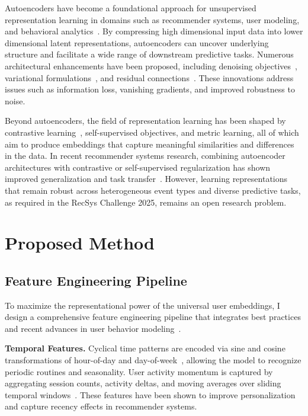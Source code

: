 \documentclass[sigconf]{acmart}
\begin{document}
Autoencoders have become a foundational approach for unsupervised representation learning in domains such as recommender systems, user modeling, and behavioral analytics~\cite{Hinton2006, Vincent2008, Kingma2014, Sedhain2015}. By compressing high dimensional input data into lower dimensional latent representations, autoencoders can uncover underlying structure and facilitate a wide range of downstream predictive tasks. Numerous architectural enhancements have been proposed, including denoising objectives~\cite{Vincent2008}, variational formulations~\cite{Kingma2014}, and residual connections~\cite{He2016ResNet, Mao2016}. These innovations address issues such as information loss, vanishing gradients, and improved robustness to noise.

Beyond autoencoders, the field of representation learning has been shaped by contrastive learning~\cite{Oord2018, Chen2020SimCLR}, self-supervised objectives, and metric learning, all of which aim to produce embeddings that capture meaningful similarities and differences in the data. In recent recommender systems research, combining autoencoder architectures with contrastive or self-supervised regularization has shown improved generalization and task transfer~\cite{Zhou2020S3Rec, Zhan2022CLAES}. However, learning representations that remain robust across heterogeneous event types and diverse predictive tasks, as required in the RecSys Challenge 2025, remains an open research problem.

\section{Proposed Method}
\label{sec:method}

\subsection{Feature Engineering Pipeline}

To maximize the representational power of the universal user embeddings, I design a comprehensive feature engineering pipeline that integrates best practices and recent advances in user behavior modeling~\cite{Quadrana2018, Christoffel2022, Covington2016, Rendle2010, Hidasi2016, Wang2019}.

\textbf{Temporal Features.}
Cyclical time patterns are encoded via sine and cosine transformations of hour-of-day and day-of-week~\cite{Laptev2017}, allowing the model to recognize periodic routines and seasonality. User activity momentum is captured by aggregating session counts, activity deltas, and moving averages over sliding temporal windows~\cite{Quadrana2018}. These features have been shown to improve personalization and capture recency effects in recommender systems.
\end{document}
